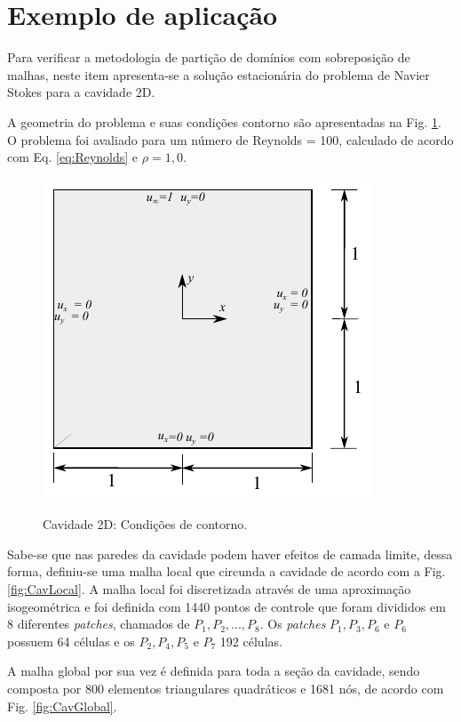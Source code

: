 \documentclass[tese_patricia]{subfiles}
\begin{document}
\section{Exemplo de aplicação}

Para verificar a metodologia de partição de domínios com sobreposição de malhas, neste item apresenta-se a solução estacionária do problema de Navier Stokes para a cavidade 2D.

A geometria do problema e suas condições contorno são apresentadas na Fig. \ref{fig:CavBoundary}. O problema foi avaliado para um número de Reynolds = 100, calculado de acordo com Eq. \eqref{eq:Reynolds} e $\rho = 1,0$.

\begin{figure}[!htb]
	\centering
	{\includegraphics[scale=1.3,trim=0cm 0cm 0cm 0cm, clip=true]{Imagens/Cap5/cavidade.pdf}}
	\caption{Cavidade 2D: Condições de contorno.} 
	\label{fig:CavBoundary}
\end{figure}

Sabe-se que nas paredes da cavidade podem haver efeitos de camada limite, dessa forma, definiu-se uma malha local que circunda a cavidade de acordo com a Fig. \ref{fig:CavLocal}. A malha local foi discretizada através de uma aproximação isogeométrica e foi definida com 1440 pontos de controle que foram divididos em 8 diferentes \textit{patches}, chamados de $P_{1},P_{2},...,P_{8}$. Os \textit{patches} $P_{1},P_{3},P_{6}$ e $P_{6}$ possuem 64 células e os $P_{2},P_{4},P_{5}$ e $P_{7}$ 192 células.

A malha global por sua vez é definida para toda a seção da cavidade, sendo composta por 800 elementos triangulares quadráticos e 1681 nós, de acordo com Fig. \ref{fig:CavGlobal}.
\end{document}
